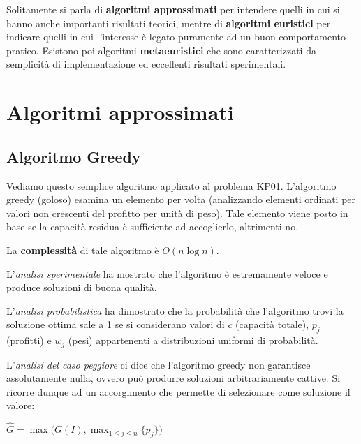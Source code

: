 \documentclass[11pt, oneside]{book}
\begin{document}
Solitamente si parla di {\bf algoritmi approssimati} per intendere
quelli in cui si hanno anche importanti risultati teorici, mentre di
{\bf algoritmi euristici} per indicare quelli in cui l'interesse \`e
legato puramente ad un buon comportamento pratico. Esistono poi
algoritmi {\bf metaeuristici} che sono caratterizzati da semplicit\`a
di implementazione ed eccellenti risultati sperimentali.

\section{Algoritmi approssimati}

\subsection{Algoritmo Greedy}

Vediamo questo semplice algoritmo applicato al problema
KP01. L'algoritmo greedy (goloso) esamina un elemento per volta
(analizzando elementi ordinati per valori non crescenti del profitto
per unit\`a di peso). Tale elemento viene posto in base se la
capacit\`a residua \`e sufficiente ad accoglierlo, altrimenti no.

\par\bigskip

La {\bf complessit\`a} di tale algoritmo \`e $O(n\log{n})$.

\par\bigskip

L'{\em analisi sperimentale} ha mostrato che l'algoritmo \`e
estremamente veloce e produce soluzioni di buona qualit\`a.

\par\bigskip

L'{\em analisi probabilistica} ha dimostrato che la probabilit\`a che
l'algoritmo trovi la soluzione ottima sale a 1 se si considerano
valori di $c$ (capacit\`a totale), $p_j$ (profitti) e $w_j$ (pesi)
appartenenti a distribuzioni uniformi di probabilit\`a.

\par\bigskip

L'{\em analisi del caso peggiore} ci dice che l'algoritmo greedy non
garantisce assolutamente nulla, ovvero pu\`o produrre soluzioni
arbitrariamente cattive. Si ricorre dunque ad un accorgimento che
permette di selezionare come soluzione il valore:

\begin{center}
$\hat{G} = \max \bigr( G(I), \max_{1 \leq j \leq n}\{p_j\} \bigr)$
\end{center}
\end{document}
